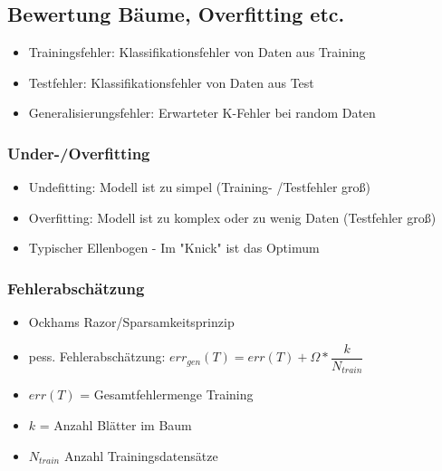 \documentclass[a4paper]{article}
\begin{document}
\begin{landscape}
\begin{multicols}{3}
        \subsection{Bewertung Bäume, Overfitting etc.}
        \begin{itemize}[noitemsep,nolistsep]
            \item Trainingsfehler: Klassifikationsfehler von Daten aus Training
            \item Testfehler:  Klassifikationsfehler von Daten aus Test
            \item Generalisierungsfehler: Erwarteter K-Fehler bei random Daten
        \end{itemize}
        \subsubsection{Under-/Overfitting}
        \begin{itemize}[noitemsep,nolistsep]
            \item Undefitting: Modell ist zu simpel (Training- /Testfehler groß)
            \item Overfitting: Modell ist zu komplex oder zu wenig Daten (Testfehler groß)
            \item Typischer Ellenbogen - Im "Knick" ist das Optimum
        \end{itemize}

        \subsubsection{Fehlerabschätzung}
        \begin{itemize}[noitemsep,nolistsep]
            \item Ockhams Razor/Sparsamkeitsprinzip
            \item pess. Fehlerabschätzung: $err_{gen}(T) = err(T) + \Omega * \dfrac{k}{N_{train}}$
            \item $err(T)$ = Gesamtfehlermenge Training
            \item $k$ = Anzahl Blätter im Baum
            \item $N_{train}$ Anzahl Trainingsdatensätze
        \end{itemize}
        

\end{multicols}
\end{landscape}
\end{document}
